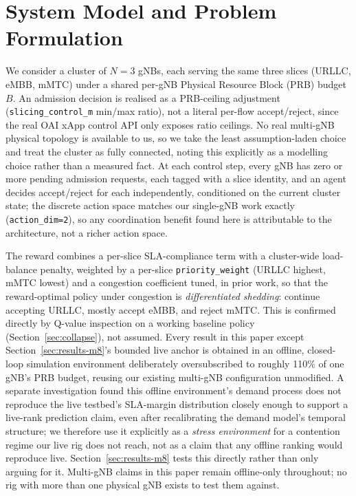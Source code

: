 \documentclass[pdflatex,sn-basic,Numbered]{sn-jnl}%
\begin{document}
\section{System Model and Problem Formulation}
\label{sec:system-model}
We consider a cluster of $N{=}3$ gNBs, each serving the same three
slices (URLLC, eMBB, mMTC) under a shared per-gNB Physical Resource
Block (PRB) budget $B$. An admission decision is realised as a
PRB-ceiling adjustment (\texttt{slicing\_control\_m} min/max ratio),
not a literal per-flow accept/reject, since the real OAI xApp control
API only exposes ratio ceilings. No real multi-gNB physical topology is
available to us, so we take the least assumption-laden choice and
treat the cluster as fully connected, noting this explicitly as a
modelling choice rather than a measured fact. At each control step,
every gNB has zero or more pending admission requests, each tagged
with a slice identity, and an agent decides accept/reject for each
independently, conditioned on the current cluster state; the discrete
action space matches our single-gNB work exactly
(\texttt{action\_dim=2}), so any coordination benefit found here is
attributable to the architecture, not a richer action space.

The reward combines a per-slice SLA-compliance term with a
cluster-wide load-balance penalty, weighted by a per-slice
\texttt{priority\_weight} (URLLC highest, mMTC lowest) and a congestion
coefficient tuned, in prior work, so that the reward-optimal policy
under congestion is \emph{differentiated shedding}: continue accepting
URLLC, mostly accept eMBB, and reject mMTC. This is confirmed directly by Q-value inspection on a working baseline policy (Section~\ref{sec:collapse}), not assumed. Every result in this paper
except Section~\ref{sec:results-m8}'s bounded live anchor is obtained
in an offline, closed-loop simulation environment deliberately
oversubscribed to roughly 110\% of one gNB's PRB budget, reusing our
existing multi-gNB configuration unmodified. A separate investigation
found this offline environment's demand process does not reproduce the
live testbed's SLA-margin distribution closely enough to support a
live-rank prediction claim, even after recalibrating the demand
model's temporal structure; we therefore use it explicitly as a \emph{stress environment} for a contention regime our live rig does not reach, not as a claim that any offline ranking would reproduce live. Section~\ref{sec:results-m8} tests this directly rather than only arguing for it. Multi-gNB claims in this paper remain
offline-only throughout; no rig with more than one physical gNB exists
to test them against.
\end{document}
